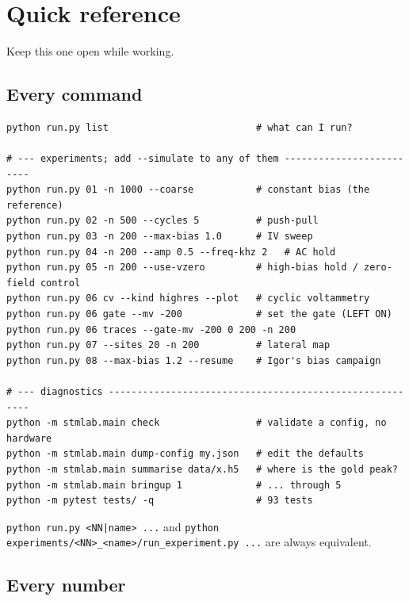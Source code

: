 \setcounter{chapter}{29}
\chapter{Quick reference}

Keep this one open while working.

\section{Every command}

\begin{lstlisting}[style=out]
python run.py list                          # what can I run?

# --- experiments; add --simulate to any of them -------------------------
python run.py 01 -n 1000 --coarse           # constant bias (the reference)
python run.py 02 -n 500 --cycles 5          # push-pull
python run.py 03 -n 200 --max-bias 1.0      # IV sweep
python run.py 04 -n 200 --amp 0.5 --freq-khz 2   # AC hold
python run.py 05 -n 200 --use-vzero         # high-bias hold / zero-field control
python run.py 06 cv --kind highres --plot   # cyclic voltammetry
python run.py 06 gate --mv -200             # set the gate (LEFT ON)
python run.py 06 traces --gate-mv -200 0 200 -n 200
python run.py 07 --sites 20 -n 200          # lateral map
python run.py 08 --max-bias 1.2 --resume    # Igor's bias campaign

# --- diagnostics --------------------------------------------------------
python -m stmlab.main check                 # validate a config, no hardware
python -m stmlab.main dump-config my.json   # edit the defaults
python -m stmlab.main summarise data/x.h5   # where is the gold peak?
python -m stmlab.main bringup 1             # ... through 5
python -m pytest tests/ -q                  # 93 tests
\end{lstlisting}

\texttt{python run.\discretionary{}{}{}py <NN|name> .\discretionary{}{}{}.\discretionary{}{}{}.\discretionary{}{}{}} and \texttt{python experiments/\discretionary{}{}{}<NN>\_\discretionary{}{}{}<name>/\discretionary{}{}{}run\_\discretionary{}{}{}experiment.\discretionary{}{}{}py .\discretionary{}{}{}.\discretionary{}{}{}.\discretionary{}{}{}} are always equivalent.

\section{Every number}

